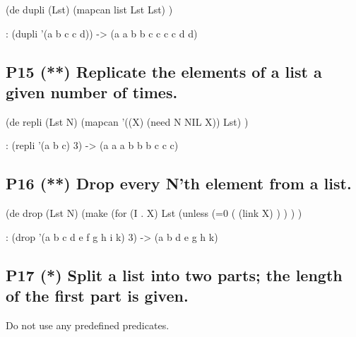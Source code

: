 \begin{wideverbatim}

(de dupli (Lst)
   (mapcan list Lst Lst) )

\end{wideverbatim}

\begin{wideverbatim}
   : (dupli '(a b c c d))
   -> (a a b b c c c c d d)
\end{wideverbatim}

\pagebreak{}
\subsection*{{P15} (**) Replicate the elements of a list
a given number of times.}
\label{sec:99-problems-P15}

\begin{wideverbatim}

(de repli (Lst N)
   (mapcan '((X) (need N NIL X)) Lst) )

\end{wideverbatim}

\begin{wideverbatim}
   : (repli '(a b c) 3)
   -> (a a a b b b c c c)
\end{wideverbatim}


\subsection*{{P16} (**) Drop every N'th element from a
list.}
\label{sec:99-problems-P16}

\begin{wideverbatim}

(de drop (Lst N)
   (make
      (for (I . X) Lst
         (unless (=0 (%
            (link X) ) ) ) )

\end{wideverbatim}

\begin{wideverbatim}
   : (drop '(a b c d e f g h i k) 3)
   -> (a b d e g h k)
\end{wideverbatim}


\subsection*{{P17} (*) Split a list into two parts; the
length of the first part is given.}
\label{sec:99-problems-P17}

Do not use any predefined predicates.


